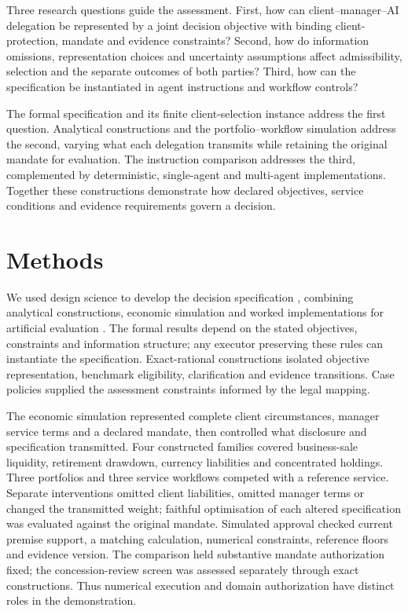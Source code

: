 \documentclass[oneside,10pt,english]{swissi}
\begin{document}
Three research questions guide the assessment. First, how can client--manager--AI delegation be represented by a joint decision objective with binding client-protection, mandate and evidence constraints? Second, how do information omissions, representation choices and uncertainty assumptions affect admissibility, selection and the separate outcomes of both parties? Third, how can the specification be instantiated in agent instructions and workflow controls?

The formal specification and its finite client-selection instance address the first question. Analytical constructions and the portfolio--workflow simulation address the second, varying what each delegation transmits while retaining the original mandate for evaluation. The instruction comparison addresses the third, complemented by deterministic, single-agent and multi-agent implementations. Together these constructions demonstrate how declared objectives, service conditions and evidence requirements govern a decision.

\section{Methods}\label{sec:methods}

We used design science to develop the decision specification \parencite{hevner2004designscience,peffers2007dsrm}, combining analytical constructions, economic simulation and worked implementations for artificial evaluation \parencite{venable2016feds}. The formal results depend on the stated objectives, constraints and information structure; any executor preserving these rules can instantiate the specification. Exact-rational constructions isolated objective representation, benchmark eligibility, clarification and evidence transitions. Case policies supplied the assessment constraints informed by the legal mapping.

The economic simulation represented complete client circumstances, manager service terms and a declared mandate, then controlled what disclosure and specification transmitted. Four constructed families covered business-sale liquidity, retirement drawdown, currency liabilities and concentrated holdings. Three portfolios and three service workflows competed with a reference service. Separate interventions omitted client liabilities, omitted manager terms or changed the transmitted weight; faithful optimisation of each altered specification was evaluated against the original mandate. Simulated approval checked current premise support, a matching calculation, numerical constraints, reference floors and evidence version. The comparison held substantive mandate authorization fixed; the concession-review screen was assessed separately through exact constructions. Thus numerical execution and domain authorization have distinct roles in the demonstration.
\end{document}
